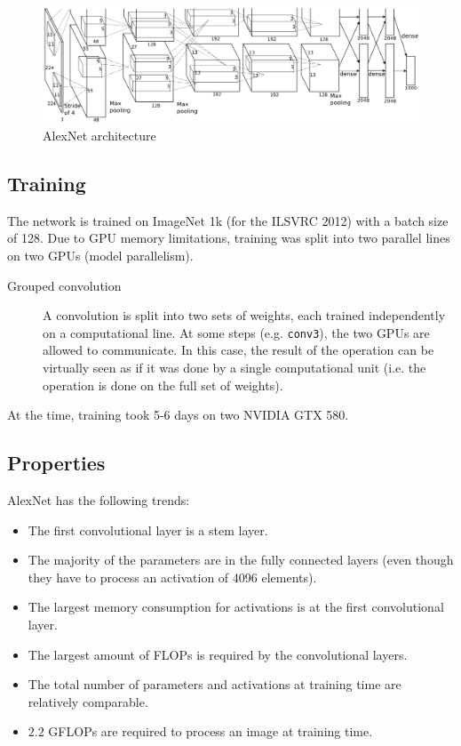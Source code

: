 \begin{figure}[H]
    \centering
    \includegraphics[width=0.75\linewidth]{./img/alexnet.png}
    \caption{AlexNet architecture}
\end{figure}


\subsection{Training}

The network is trained on ImageNet 1k (for the ILSVRC 2012) with a batch size of 128.
Due to GPU memory limitations, training was split into two parallel lines on two GPUs (model parallelism).

\begin{description}
    \item[Grouped convolution] 
        A convolution is split into two sets of weights, each trained independently on a computational line.
        At some steps (e.g. \texttt{conv3}), the two GPUs are allowed to communicate.
        In this case, the result of the operation can be virtually seen as if it was done by a single computational unit (i.e. the operation is done on the full set of weights).
\end{description}

\begin{remark}
    At the time, training took 5-6 days on two NVIDIA GTX 580.
\end{remark}


\subsection{Properties}

AlexNet has the following trends:
\begin{itemize}
    \item The first convolutional layer is a stem layer.
    \item The majority of the parameters are in the fully connected layers (even though they have to process an activation of 4096 elements).
    \item The largest memory consumption for activations is at the first convolutional layer.
    \item The largest amount of FLOPs is required by the convolutional layers.
    \item The total number of parameters and activations at training time are relatively comparable.
    \item $2.2$ GFLOPs are required to process an image at training time.
\end{itemize}

